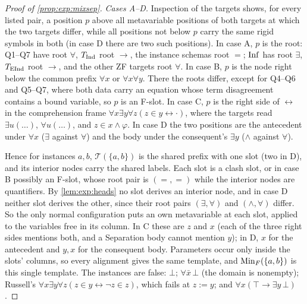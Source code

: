 \begin{proof}[Proof of \cref{prop:exp:mixsep}]
\emph{Cases A--D.} Inspection of the targets shows, for every listed pair, a position $p$ above all metavariable positions of both targets at which the two targets differ, while all positions not below $p$ carry the same rigid symbols in both (in case D there are two such positions). In case A, $p$ is the root: Q1--Q7 have root $\forall$, $T_{\mathrm{Ind}}$ root $\to$, the instance schemas root $=$; $\mathrm{Inf}$ has root $\exists$, $T_{\mathrm{EInd}}$ root $\to$, and the other ZF targets root $\forall$. In case B, $p$ is the node right below the common prefix $\forall x$ or $\forall x\forall y$. There the roots differ, except for Q4--Q6 and Q5--Q7, where both data carry an equation whose term disagreement contains a bound variable, so $p$ is an F-slot. In case C, $p$ is the right side of $\leftrightarrow$ in the comprehension frame $\forall x\exists y\forall z(z\in y\leftrightarrow\cdot)$, where the targets read $\exists u(\dots)$, $\forall u(\dots)$, and $z\in x\wedge\varphi$. In case D the two positions are the antecedent under $\forall x$ ($\exists$ against $\forall$) and the body under the consequent's $\exists y$ ($\wedge$ against $\forall$).

Hence for instances $a,b$, $\mathcal T(\{a,b\})$ is the shared prefix with one slot (two in D), and its interior nodes carry the shared labels. Each slot is a clash slot, or in case B possibly an F-slot, whose root pair is $(=,=)$ while the interior nodes are quantifiers. By \cref{lem:exp:heads} no slot derives an interior node, and in case D neither slot derives the other, since their root pairs $(\exists,\forall)$ and $(\wedge,\forall)$ differ. So the only normal configuration puts an own metavariable at each slot, applied to the variables free in its column. In C these are $z$ and $x$ (each of the three right sides mentions both, and a Separation body cannot mention $y$); in D, $x$ for the antecedent and $y,x$ for the consequent body. Parameters occur only inside the slots' columns, so every alignment gives the same template, and $\mathrm{Min}_F(\{a,b\})$ is this single template. The instances are false: $\bot$; $\forall\bar x\,\bot$ (the domain is nonempty); Russell's $\forall x\exists y\forall z(z\in y\leftrightarrow\neg z\in z)$, which fails at $z:=y$; and $\forall x(\top\to\exists y\,\bot)$.


\end{proof}
